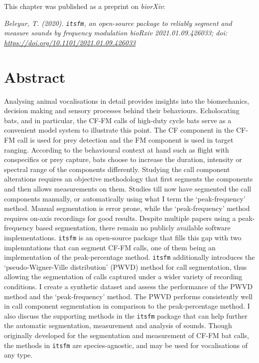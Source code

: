 \documentclass[
]{book}
\begin{document}

This chapter was published as a preprint on \emph{biorXiv}:

\emph{Beleyur, T. (2020). \texttt{itsfm}, an open-source package to reliably segment and measure sounds by frequency modulation bioRxiv 2021.01.09.426033; doi: \url{https://doi.org/10.1101/2021.01.09.426033} }

\newpage

\hypertarget{abstractitsfm}{%
\section*{Abstract}\label{abstractitsfm}}

Analysing animal vocalisations in detail provides insights into the biomechanics, decision making and sensory processes behind their behaviours. Echolocating bats, and in particular, the CF-FM calls of high-duty cycle bats serve as a convenient model system to illustrate this point. The CF component in the CF-FM call is used for prey detection and the FM component is used in target ranging. According to the behavioural context at hand such as flight with conspecifics or prey capture, bats choose to increase the duration, intensity or spectral range of the components differently. Studying the call component alterations requires an objective methodology that first segments the components and then allows measurements on them. Studies till now have segmented the call components manually, or automatically using what I term the `peak-frequency' method. Manual segmentation is error prone, while the `peak-frequency' method requires on-axis recordings for good results. Despite multiple papers using a peak-frequency based segmentation, there remain no publicly available software implementations. \texttt{itsfm} is an open-source package that fills this gap with two implemntations that can segment CF-FM calls, one of them being an implementation of the peak-percentage method. \texttt{itsfm} additionally introduces the `pseudo-Wigner-Ville distribution' (PWVD) method for call segmentation, thus allowing the segmentation of calls captured under a wider variety of recording conditions. I create a synthetic dataset and assess the performance of the PWVD method and the `peak-frequency' method. The PWVD performs consistently well in call component segmentation in comparison to the peak-percentage method. I also discuss the supporting methods in the \texttt{itsfm} package that can help further the automatic segmentation, measurement and analysis of sounds. Though originally developed for the segmentation and measurement of CF-FM bat calls, the methods in \texttt{itsfm} are species-agnostic, and may be used for vocalisations of any type.
\end{document}
